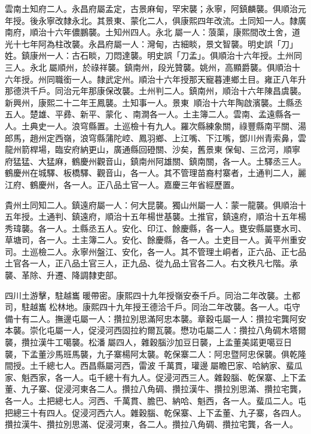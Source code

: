 \begin{pinyinscope}
雲南土知府二人。永昌府屬孟定，古景麻甸，罕宋襲；永寧，阿鎮麟襲。俱順治元年授。後永寧改隸永北。其景東、蒙化二人，俱康熙四年改流。土同知一人。隸廣南府，順治十六年儂鵬襲。土知州四人。永北屬一人：蒗蕖，康熙間改土舍，道光十七年阿為柱改襲。永昌府屬一人：灣甸，古細睒，景文智襲。明史誤「刀」姓。鎮康州一人：古石睒，刀悶達襲。明史誤「刀孟」。俱順治十六年授。土州同三人。永北屬順州，於祿祥襲。鎮南州，段光贊襲。姚州，高顯爵襲。俱順治十六年授。州同職銜一人。隸武定州。順治十六年授那天寵暮連鄉土目。雍正八年升那德洪千戶。同治元年那康保改襲。土州判二人。鎮南州，順治十六年陳昌虞襲。新興州，康熙二十二年王鳳襲。土知事一人。景東，順治十六年陶啟濱襲。土縣丞五人。楚雄、平彞、新平、蒙化、南澗各一人。土主簿二人。雲南、孟遠縣各一人。土典史一人。浪穹縣置。土巡檢十有九人。羅次縣練象關，祿豐縣南平關、湯郎馬，趙州定西嶺，浪穹縣蒲陀崆、鳳羽鄉、上江嘴、下江嘴，鄧川州青索鼻，雲龍州箭桿場，臨安府納更山，廣通縣回磴關、沙矣，舊景東保甸、三岔河，順寧府猛猛、大猛麻，鶴慶州觀音山，鎮南州阿雄關、鎮南關，各一人。土驛丞三人。鶴慶州在城驛、板橋驛、觀音山，各一人。其不管理苗裔村寨者，土通判二人，麗江府、鶴慶州，各一人。正八品土官一人。嘉慶三年省經歷置。

貴州土同知二人。鎮遠府屬一人：何大昆襲。獨山州屬一人：蒙一龍襲。俱順治十五年授。土通判、鎮遠府，順治十五年楊世基襲。土推官，鎮遠府，順治十五年楊秀瑋襲。各一人。土縣丞五人。安化、印江、餘慶縣，各一人。甕安縣屬甕水司、草塘司，各一人。土主簿二人。安化、餘慶縣，各一人。土吏目一人。黃平州重安司。土巡檢二人。永寧州盤江、安化，各一人。其不管理土峒者，正六品、正七品土官各一人，正八品土官三人，正九品、從九品土官各二人。右文秩凡七階。承襲、革除、升遷、降調隸吏部。

四川土游擊，駐越巂暖帶密。康熙四十九年授嶺安泰千戶。同治二年改襲。土都司，駐越巂松林地。康熙四十九年授王德洽千戶。同治二年改襲。各一人。屯守備十有二人。撫邊屯屬一人：攢拉別思滿阿忠本襲。章穀屯屬一人：攢拉宅龔阿安本襲。崇化屯屬一人，促浸河西固拉約爾瓦襲。懋功屯屬二人：攢拉八角碉木塔爾襲，攢拉漢牛工噶襲。松潘屬四人，雜穀腦沙加豆日襲，上孟董美諾更噶豆日襲，下孟董沙馬班馬襲，九子寨楊阿太襲。乾保寨二人：阿忠暨阿忠保襲。俱乾隆間授。土千總七人。西昌縣屬河西，雷波千萬貫，瓘邊屬瞻巴家、哈納家、蜚瓜家、魁西家，各一人。屯千總十有九人。促浸河西三人。雜穀腦、乾保寨、上下孟董、九子寨、促浸河東各二人。攢拉八角碉、攢拉漢牛、攢拉別思滿、攢拉宅龔，各一人。土把總七人。河西、千萬貫、膽巴、納哈、魁西，各一人。蜚瓜二人。屯把總三十有四人。促浸河西六人。雜穀腦、乾保寨、上下孟董、九子寨，各四人。攢拉漢牛、攢拉別思滿、促浸河東，各二人。攢拉八角碉、攢拉宅龔，各一人。


\end{pinyinscope}
